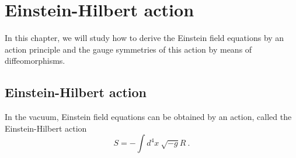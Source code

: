 \chapter{Einstein-Hilbert action}

    In this chapter, we will study how to derive the Einstein field equations by an action principle and the gauge symmetries of this action by means of diffeomorphisms.

\section{Einstein-Hilbert action}

    In the vacuum, Einstein field equations can be obtained by an action, called the Einstein-Hilbert action 
    \begin{equation*}
        S = - \int d^4 x ~ \sqrt{- g} R ~.
    \end{equation*}
